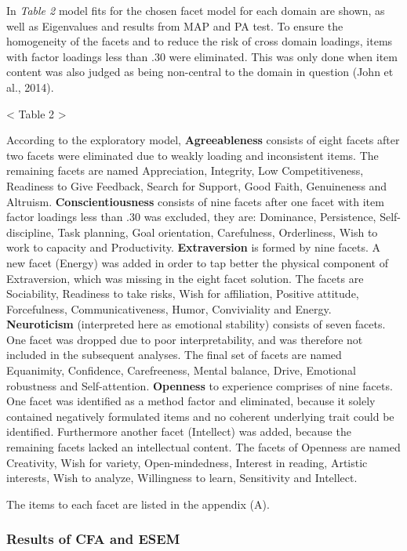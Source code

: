 \documentclass[man]{apa6}
\theoremstyle{definition}
\theoremstyle{definition}
\theoremstyle{definition}
\theoremstyle{remark}
\begin{document}
In \emph{Table 2} model fits for the chosen facet model for each domain
are shown, as well as Eigenvalues and results from MAP and PA test. To
ensure the homogeneity of the facets and to reduce the risk of cross
domain loadings, items with factor loadings less than .30 were
eliminated. This was only done when item content was also judged as
being non-central to the domain in question (John et al., 2014).

\textless{} Table 2 \textgreater{}

According to the exploratory model, \textbf{Agreeableness} consists of
eight facets after two facets were eliminated due to weakly loading and
inconsistent items. The remaining facets are named Appreciation,
Integrity, Low Competitiveness, Readiness to Give Feedback, Search for
Support, Good Faith, Genuineness and Altruism.
\textbf{Conscientiousness} consists of nine facets after one facet with
item factor loadings less than .30 was excluded, they are: Dominance,
Persistence, Self-discipline, Task planning, Goal orientation,
Carefulness, Orderliness, Wish to work to capacity and Productivity.
\textbf{Extraversion} is formed by nine facets. A new facet (Energy) was
added in order to tap better the physical component of Extraversion,
which was missing in the eight facet solution. The facets are
Sociability, Readiness to take risks, Wish for affiliation, Positive
attitude, Forcefulness, Communicativeness, Humor, Conviviality and
Energy. \textbf{Neuroticism} (interpreted here as emotional stability)
consists of seven facets. One facet was dropped due to poor
interpretability, and was therefore not included in the subsequent
analyses. The final set of facets are named Equanimity, Confidence,
Carefreeness, Mental balance, Drive, Emotional robustness and
Self-attention. \textbf{Openness} to experience comprises of nine
facets. One facet was identified as a method factor and eliminated,
because it solely contained negatively formulated items and no coherent
underlying trait could be identified. Furthermore another facet
(Intellect) was added, because the remaining facets lacked an
intellectual content. The facets of Openness are named Creativity, Wish
for variety, Open-mindedness, Interest in reading, Artistic interests,
Wish to analyze, Willingness to learn, Sensitivity and Intellect.

The items to each facet are listed in the appendix (A).

\hypertarget{results-of-cfa-and-esem}{%
\subsubsection{Results of CFA and ESEM}\label{results-of-cfa-and-esem}}
\end{document}
